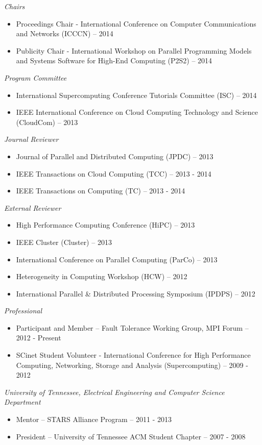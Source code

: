 {\sl Chairs}
\begin{itemize}
    \item Proceedings Chair - International Conference on Computer
        Communications and Networks (ICCCN) -- 2014
    \item Publicity Chair - International Workshop on Parallel Programming
        Models and Systems Software for High-End Computing (P2S2) -- 2014
\end{itemize}

{\sl Program Committee}
\begin{itemize}
    \item International Supercomputing Conference Tutorials Committee (ISC) --
        2014
    \item IEEE International Conference on Cloud Computing Technology and
        Science (CloudCom) -- 2013
\end{itemize}

{\sl Journal Reviewer}
\begin{itemize}
    \item Journal of Parallel and Distributed Computing (JPDC) -- 2013
    \item IEEE Transactions on Cloud Computing (TCC) -- 2013 - 2014
    \item IEEE Transactions on Computing (TC) -- 2013 - 2014
\end{itemize}

{\sl External Reviewer}
\begin{itemize}
    \item High Performance Computing Conference (HiPC) -- 2013
    \item IEEE Cluster (Cluster) -- 2013
    \item International Conference on Parallel Computing (ParCo) -- 2013
    \item Heterogeneity in Computing Workshop (HCW) -- 2012
    \item International Parallel \& Distributed Processing Symposium (IPDPS) -- 2012
\end{itemize}

{\sl Professional}
\begin{itemize}
    \item Participant and Member -- Fault Tolerance Working Group, MPI Forum -- 2012 - Present
    \item SCinet Student Volunteer - International Conference for High
        Performance Computing, Networking, Storage and Analysis
        (Supercomputing) -- 2009 - 2012
\end{itemize}

{\sl University of Tennessee, Electrical Engineering and Computer Science Department}
\begin{itemize}
    \item Mentor -- STARS Alliance Program -- 2011 - 2013
    \item President -- University of Tennessee ACM Student Chapter -- 2007 - 2008
\end{itemize}
